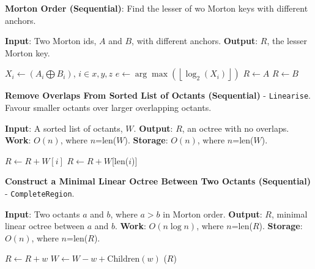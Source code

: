 \begin{algorithm}
    \caption{\textbf{Morton Order (Sequential)}: Find the lesser of wo Morton keys with different anchors.}
    \label{alg:ch_6:morton_ordering}
    \begin{algorithmic}
    
        \STATE \textbf{Input}: Two Morton ids, $A$ and $B$, with different anchors.
        \STATE \textbf{Output}: $R$, the lesser Morton key.
        
        \STATE $X_i \gets (A_i \bigoplus B_i)$, $i \in {x, y, z}$
        \STATE $e \gets \arg \max \left ( \left \lfloor \log_2(X_i) \right \rfloor \right )$
            \STATE $R \gets A$
        \ELSE
            \STATE $R \gets B$
        \ENDIF
    \end{algorithmic}
\end{algorithm}
    

\begin{algorithm}
    \caption{\textbf{Remove Overlaps From Sorted List of Octants (Sequential)} - \texttt{Linearise}. Favour smaller octants over larger overlapping octants.}
    \label{alg:ch_6:linearise_octree}
    \begin{algorithmic}
    
        \STATE \textbf{Input}: A sorted list of octants, $W$.
        \STATE \textbf{Output}: $R$, an octree with no overlaps.
        \STATE \textbf{Work}: $O(n)$, where $n$=len($W$).
        \STATE \textbf{Storage}: $O(n)$, where $n$=len($W$).
    
                \STATE $R \gets R + W[i]$  
            \ENDIF
        \ENDFOR
        \STATE $R\gets R+W$[len($i$)]
    \end{algorithmic}
\end{algorithm}
    

\begin{algorithm}
    \caption{\textbf{Construct a Minimal Linear Octree Between Two Octants (Sequential)} - \texttt{CompleteRegion}.}
    \label{alg:ch_6:complete_region}
    \begin{algorithmic}
        \STATE \textbf{Input}: Two octants $a$ and $b$, where $a > b$ in Morton order. 
        \STATE \textbf{Output}: $R$, minimal linear octree between $a$ and $b$. 
        \STATE \textbf{Work}: $O(n \log n)$, where $n$=len($R$).
        \STATE \textbf{Storage}: $O(n)$, where $n$=len($R$).

                \STATE $R \gets R + w$
                \STATE $W \gets W - w + \text{Children}(w)$
            \ENDIF
        \ENDFOR
        \STATE {}($R$)
    \end{algorithmic}
\end{algorithm}

